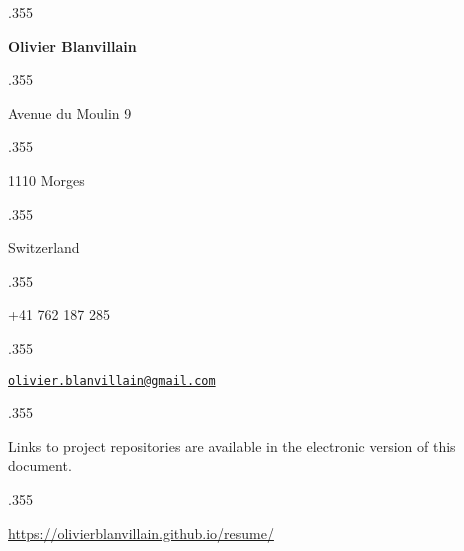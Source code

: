 \documentclass[margin, a4paper]{res}
\let\link\href
\renewcommand{\href}[2]{\link{#1}{\scriptsize{\faExternalLink}}}
\newcommand{\centered}[1]{\moveleft.355\hoffset\centerline{#1}}
\begin{document}
\centered{\LARGE\textbf{Olivier Blanvillain}}
\vspace{3pt}
\centered{Avenue du Moulin 9}
\centered{1110 Morges}
\centered{Switzerland}
\vspace{3pt}
\centered{+41 762 187 285}
\centered{\link{mailto:olivier.blanvillain@gmail.com}{\texttt{olivier.blanvillain@gmail.com}}}

\begin{resume}
  
\end{resume}

\vspace{25pt}

\centered{\footnotesize Links to project repositories are available in the electronic version of this document.}
\centered{\footnotesize\url{https://olivierblanvillain.github.io/resume/}}
\end{document}
